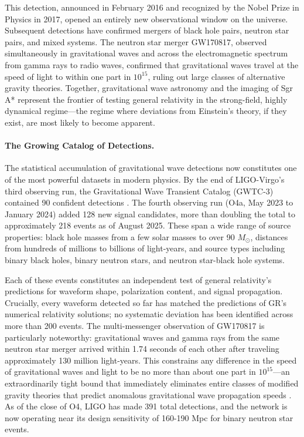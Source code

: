 \documentclass[12pt, a4paper]{article}
\begin{document}
	This detection, announced in February 2016 and recognized by the Nobel Prize in Physics in 2017, opened an entirely new observational window on the universe. Subsequent detections have confirmed mergers of black hole pairs, neutron star pairs, and mixed systems. The neutron star merger GW170817, observed simultaneously in gravitational waves and across the electromagnetic spectrum from gamma rays to radio waves, confirmed that gravitational waves travel at the speed of light to within one part in \(10^{15}\), ruling out large classes of alternative gravity theories. Together, gravitational wave astronomy and the imaging of Sgr A* represent the frontier of testing general relativity in the strong-field, highly dynamical regime---the regime where deviations from Einstein's theory, if they exist, are most likely to become apparent.
	
	\paragraph{The Growing Catalog of Detections.}
	The statistical accumulation of gravitational wave detections now constitutes one of the most powerful datasets in modern physics. By the end of LIGO-Virgo's third observing run, the Gravitational Wave Transient Catalog (GWTC-3) contained 90 confident detections \citep{willConfrontationGeneralRelativity2014}. The fourth observing run (O4a, May 2023 to January 2024) added 128 new signal candidates, more than doubling the total to approximately 218 events as of August 2025. These span a wide range of source properties: black hole masses from a few solar masses to over 90 $M_\odot$, distances from hundreds of millions to billions of light-years, and source types including binary black holes, binary neutron stars, and neutron star-black hole systems.
	
	Each of these events constitutes an independent test of general relativity's predictions for waveform shape, polarization content, and signal propagation. Crucially, every waveform detected so far has matched the predictions of GR's numerical relativity solutions; no systematic deviation has been identified across more than 200 events. The multi-messenger observation of GW170817 is particularly noteworthy: gravitational waves and gamma rays from the same neutron star merger arrived within 1.74 seconds of each other after traveling approximately 130 million light-years. This constrains any difference in the speed of gravitational waves and light to be no more than about one part in $10^{15}$---an extraordinarily tight bound that immediately eliminates entire classes of modified gravity theories that predict anomalous gravitational wave propagation speeds \citep{willConfrontationGeneralRelativity2014}. As of the close of O4, LIGO has made 391 total detections, and the network is now operating near its design sensitivity of 160-190 Mpc for binary neutron star events.
	
\end{document}
